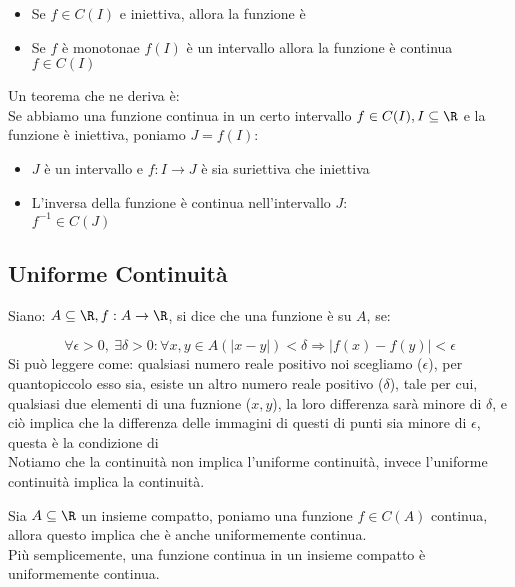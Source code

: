 \documentclass[../analisi.tex]{subfiles}
\begin{document}
\begin{itemize}
	\item Se $f \in C(I)$ e iniettiva, allora la funzione è 
	\item Se $f$ è monotonae $f(I)$ è un intervallo allora la funzione è
		continua $ f \in C(I) $
\end{itemize}
Un teorema che ne deriva è:\\
Se abbiamo una funzione continua in un certo intervallo $f \in C(I), I \subseteq \R$
e la funzione è iniettiva, poniamo $J = f(I)$:

\begin{itemize}
	\item $J$ è un intervallo e $ f: I \to J $ è sia suriettiva che iniettiva
	\item L'inversa della funzione è continua nell'intervallo $J$:\\
		$ f^{-1} \in C(J)$
\end{itemize}


\subsection{Uniforme Continuità}%
\label{sub:uniforme_continuita}
Siano: $\acr, f: A \to \R$, si dice che una funzione è 
su $A$, se:

\begin{equation}
	\forall \epsilon > 0,\ \exists \delta > 0: \forall x,y \in A
	(|x - y | ) < \delta \Longrightarrow | f(x) - f(y) | < \epsilon
\end{equation}
Si può leggere come: qualsiasi numero reale positivo noi scegliamo ($\epsilon$), 
per quantopiccolo esso sia, esiste un altro numero reale positivo ($\delta$), tale 
per cui, qualsiasi due elementi di una fuznione ($x,y$), la loro differenza sarà
 minore di $\delta$, e ciò implica che la differenza delle immagini
di questi di punti sia minore di $\epsilon$, questa è la condizione di \\
{\Large Notiamo che la continuità non implica l'uniforme continuità, invece
l'uniforme continuità implica la continuità.}


\begin{defn}
Sia $\acr$ un insieme compatto, poniamo una funzione $f \in C(A)$ continua, allora 
questo implica che è anche uniformemente continua.\\
Più semplicemente, una funzione continua in un insieme compatto è uniformemente 
continua.
\end{defn}
\end{document}
